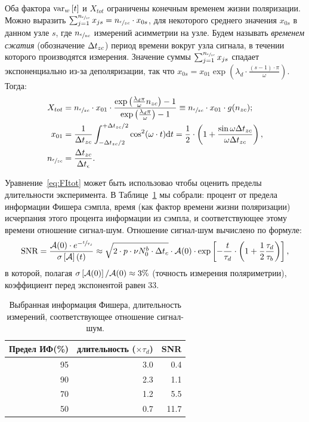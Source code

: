 \documentclass{report}
\newcommand{\td}{\mathrm{d}}
\newcommand{\cnt}{c}
\newcommand{\meas}{\epsilon}
\newcommand{\dt}{\Delta t}
\newcommand{\dtm}{\dt_{\meas}}
\newcommand{\dtc}{\dt_{\cnt}}
\newcommand{\Nmnd}{{n_{\sfrac{\meas}{zc}}}}
\newcommand{\Nnd}{{n_{zc}}}
\newcommand{\LTb}{\tau_b}
\newcommand{\LTd}{\tau_d}
\newcommand{\lamd}{\lambda_d}
\begin{document}
Оба фактора $\var[w]{t}$ и $X_{tot}$ ограничены конечным временем
жизни поляризации. Можно выразить $\sum_{j=1}^{\Nmnd} x_{js} = \Nmnd
\cdot x_{0s}$, для некоторого среднего значения $x_{0s}$ в данном узле
$s$, где $\Nmnd$ измерений асимметрии на узле. Будем называть
\emph{временем сжатия} (обозначение $\dtnd$) период времени вокруг узла
сигнала, в течении которого производятся измерения. Значение суммы
$\sum_{j=1}^{\Nmnd} x_{js}$ спадает экспоненциально из-за
деполяризации, так что $x_{0s} = x_{01}\exp{(\lamd\cdot \frac{(s-1)\cdot\pi}{\omega})}$. Тогда:
\begin{align}
	X_{tot} & = \Nmnd\cdot x_{01} \cdot \frac{\exp{\bkt{\frac{\lamd\pi}{\omega}\Nnd}}-1}{\exp{\bkt{\frac{\lamd\pi}{\omega}}}-1} 
	\equiv \Nmnd \cdot x_{01}\cdot g(\Nnd); \label{eq:FItot}\\
	x_{01}  & = \frac{1}{\dtnd}\int_{-\dtnd/2}^{+\dtnd/2}\cos^2(\omega\cdot t)\td t = \frac12\cdot \bkt{1 + \frac{\sin\omega\dtnd}{\omega\dtnd}},                                    \label{eq:MeanFIZC}   \\
	\Nmnd   & = \frac{\dtnd}{\dtm}. \label{eq:NumMeasNode}
\end{align}

Уравнение~\eqref{eq:FItot} может быть использовао чтобы оценить
пределы длительности эксперимента. В Таблице~\ref{tbl:FItot} мы
собрали: процент от предела информации
Фишера сэмпла, время (как фактор времени жизни поляризации) исчерпания этого
процента информации из сэмпла, и соответствующее этому времени
отношение сигнал-шум. Отношение сигнал-шум вычислено по формуле:
\begin{equation}\label{eq:TauRatioSNR}
  \SNR = \frac{\Asym(0)\cdot e^{-\sfrac{t}{\LTd}}}{\SD{\Asym}(t)} 
  \approx \sqrt{2\cdot p\cdot\nu N_0^b\cdot \dtc}\cdot \Asym(0)\cdot \exp\bkt*{-\frac{t}{\LTd}\cdot\bkt{1+\frac12\frac{\LTd}{\LTb}}},
\end{equation}
в которой, полагая $\SD{\Asym(0)}/\Asym(0) \approx 3\%$ (точность
измерения поляриметрии), коэффициент перед экспонентой равен 33.
\begin{table}[h]
  \centering
  \caption{Выбранная информация Фишера, длительность измерений,
    соответствующее отношение сигнал-шум.\label{tbl:FItot}}
  \begin{tabular}{rrr}
    \hline
    Предел ИФ(\%) & длительность ($\times\LTd$) &  SNR \\ \hline
    95 &                    3.0 &  0.4 \\
    90 &                    2.3 &  1.1 \\
    70 &                    1.2 &  5.5 \\
    50 &                    0.7 & 11.7 \\ \hline
  \end{tabular}
\end{table}
\end{document}

